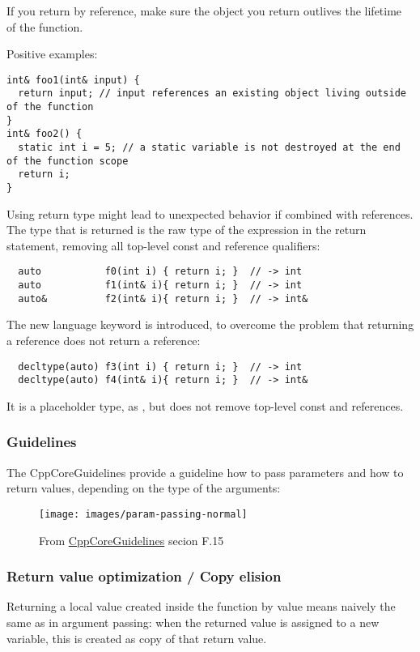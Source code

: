If you return by reference, make sure the object you return outlives the lifetime of the function.

Positive examples:
\begin{verbatim}
int& foo1(int& input) {
  return input; // input references an existing object living outside of the function
}
int& foo2() {
  static int i = 5; // a static variable is not destroyed at the end of the function scope
  return i;
}
\end{verbatim}

\begin{rem}
  Using  return type might lead to unexpected behavior if combined with references. The type that is returned is the raw type
  of the expression in the return statement, removing all top-level const and reference qualifiers:
  \begin{verbatim}
  auto           f0(int i) { return i; }  // -> int
  auto           f1(int& i){ return i; }  // -> int
  auto&          f2(int& i){ return i; }  // -> int&
  \end{verbatim}

  The new language keyword \marginpar{[\cxx{14}]} is introduced, to overcome the problem that returning a reference does not return a reference:
  \begin{verbatim}
  decltype(auto) f3(int i) { return i; }  // -> int
  decltype(auto) f4(int& i){ return i; }  // -> int&
  \end{verbatim}
  It is a placeholder type, as , but does not remove top-level const and references.
\end{rem}


\subsubsection{Guidelines}
The CppCoreGuidelines provide a guideline how to pass parameters and how to return values, depending on the type of the arguments:

\begin{figure}[ht]
\begin{center}
\texttt{[image: images/param-passing-normal]}
\end{center}
\caption{From \href{https://github.com/isocpp/CppCoreGuidelines/blob/master/CppCoreGuidelines.md}{CppCoreGuidelines} secion F.15}
\end{figure}


\subsubsection{Return value optimization / Copy elision}
Returning a local value created inside the function by value means naively the same as in argument passing: when the returned value is assigned to a
new variable, this is created as copy of that return value.

